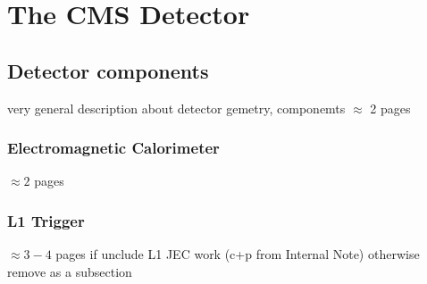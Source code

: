 \chapter{The CMS Detector}
\label{detector}

\section{Detector components}
very general description about detector gemetry, componemts
$\approx$ 2 pages
\subsection{Electromagnetic Calorimeter}
$\approx 2$ pages
\subsection{L1 Trigger}
$\approx 3-4$ pages if unclude L1 JEC work (c+p from Internal Note) 
otherwise remove as a subsection


